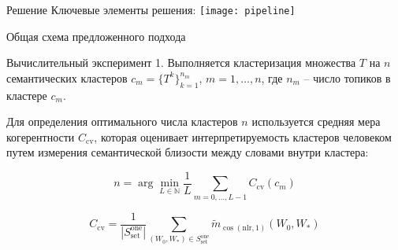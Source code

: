 \documentclass{beamer}
\begin{document}
\begin{frame}{Решение}
Ключевые элементы решения:
\centering
\texttt{[image: pipeline]}
\caption{Общая схема предложенного подхода}

\end{frame}
\begin{frame}{Вычислительный эксперимент}
1. Выполняется кластеризация множества $T$ на $n$ семантических кластеров $c_m = \{T^k\}_{k=1}^{n_m}$, $m = 1, \ldots, n$, где $n_m$ -- число топиков в кластере $c_m$. 

Для определения оптимального числа кластеров $n$ используется средняя мера когерентности $C_{\text{cv}}$, которая оценивает интерпретируемость кластеров человеком путем измерения семантической близости между словами внутри кластера:

\begin{equation}
n = \arg\min_{L \in \mathbb{N}} \frac{1}{L} \sum_{m=0,...,L-1} C_{\text{cv}}(c_m)
\end{equation}


\begin{equation}
C_{\text{cv}} = \frac{1}{|S^{\text{one}}_{\text{set}}|} \sum_{(W_0, W_*) \in S^{\text{one}}_{\text{set}}} \tilde{m}_{\cos(\text{nlr}, 1)}(W_0, W_*)
\end{equation}

\end{frame}
\end{document}
